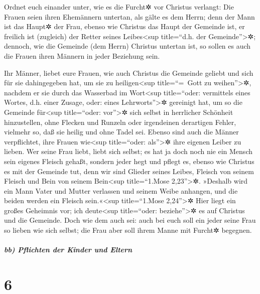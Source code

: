  Ordnet euch einander unter, wie es die Furcht✲ vor
Christus verlangt:  Die Frauen seien ihren Ehemännern
untertan, als gälte es dem Herrn;  denn der Mann ist das
Haupt✲ der Frau, ebenso wie Christus das Haupt der Gemeinde ist, er
freilich ist (zugleich) der Retter seines Leibes\textless sup
title=``d.h. der Gemeinde''\textgreater✲;  dennoch, wie
die Gemeinde (dem Herrn) Christus untertan ist, so sollen es auch die
Frauen ihren Männern in jeder Beziehung sein.

 Ihr Männer, liebet eure Frauen, wie auch Christus die
Gemeinde geliebt und sich für sie dahingegeben hat,  um
sie zu heiligen\textless sup title=``=~Gott zu weihen''\textgreater✲,
nachdem er sie durch das Wasserbad im Wort\textless sup title=``oder:
vermittels eines Wortes, d.h. einer Zusage, oder: eines
Lehrworts''\textgreater✲ gereinigt hat,  um so die
Gemeinde für\textless sup title=``oder: vor''\textgreater✲ sich selbst
in herrlicher Schönheit hinzustellen, ohne Flecken und Runzeln oder
irgendeinen derartigen Fehler, vielmehr so, daß sie heilig und ohne
Tadel sei.  Ebenso sind auch die Männer verpflichtet,
ihre Frauen wie\textless sup title=``oder: als''\textgreater✲ ihre
eigenen Leiber zu lieben. Wer seine Frau liebt, liebt sich selbst;
 es hat ja doch noch nie ein Mensch sein eigenes Fleisch
gehaßt, sondern jeder hegt und pflegt es, ebenso wie Christus es mit der
Gemeinde tut,  denn wir sind Glieder seines Leibes,
Fleisch von seinem Fleisch und Bein von seinem Bein\textless sup
title=``1.Mose 2,23''\textgreater✲.  »Deshalb wird ein
Mann Vater und Mutter verlassen und seinem Weibe anhangen, und die
beiden werden ein Fleisch sein.«\textless sup title=``1.Mose
2,24''\textgreater✲  Hier liegt ein großes Geheimnis vor;
ich deute\textless sup title=``oder: beziehe''\textgreater✲ es auf
Christus und die Gemeinde.  Doch wie dem auch sei: auch
bei euch soll ein jeder seine Frau so lieben wie sich selbst; die Frau
aber soll ihrem Manne mit Furcht✲ begegnen.

\hypertarget{bb-pflichten-der-kinder-und-eltern}{%
\subparagraph{bb) Pflichten der Kinder und
Eltern}\label{bb-pflichten-der-kinder-und-eltern}}

\hypertarget{section-5}{%
\section{6}\label{section-5}}

